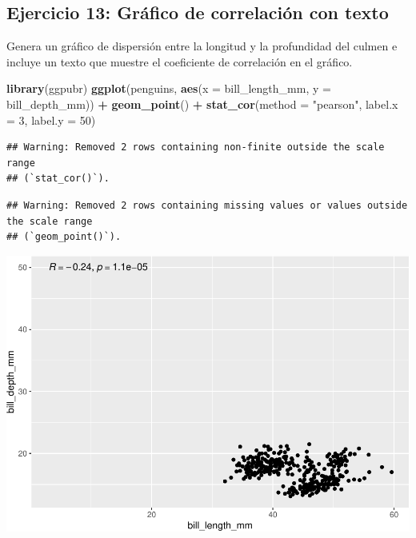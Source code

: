 \documentclass[
]{book}
\newenvironment{Shaded}{\begin{snugshade}}{\end{snugshade}}
\newcommand{\AttributeTok}[1]{\textcolor[rgb]{0.13,0.29,0.53}{#1}}
\newcommand{\DecValTok}[1]{\textcolor[rgb]{0.00,0.00,0.81}{#1}}
\newcommand{\FunctionTok}[1]{\textcolor[rgb]{0.13,0.29,0.53}{\textbf{#1}}}
\newcommand{\NormalTok}[1]{#1}
\newcommand{\SpecialCharTok}[1]{\textcolor[rgb]{0.81,0.36,0.00}{\textbf{#1}}}
\newcommand{\StringTok}[1]{\textcolor[rgb]{0.31,0.60,0.02}{#1}}
\begin{document}
\hypertarget{ejercicio-13-gruxe1fico-de-correlaciuxf3n-con-texto}{%
\subsection{Ejercicio 13: Gráfico de correlación con texto}\label{ejercicio-13-gruxe1fico-de-correlaciuxf3n-con-texto}}

Genera un gráfico de dispersión entre la longitud y la profundidad del culmen e incluye un texto que muestre el coeficiente de correlación en el gráfico.

\begin{Shaded}
\begin{Highlighting}[]
\FunctionTok{library}\NormalTok{(ggpubr)}
\FunctionTok{ggplot}\NormalTok{(penguins, }\FunctionTok{aes}\NormalTok{(}\AttributeTok{x =}\NormalTok{ bill\_length\_mm, }\AttributeTok{y =}\NormalTok{ bill\_depth\_mm)) }\SpecialCharTok{+}
  \FunctionTok{geom\_point}\NormalTok{() }\SpecialCharTok{+}
  \FunctionTok{stat\_cor}\NormalTok{(}\AttributeTok{method =} \StringTok{"pearson"}\NormalTok{, }\AttributeTok{label.x =} \DecValTok{3}\NormalTok{, }\AttributeTok{label.y =} \DecValTok{50}\NormalTok{)}
\end{Highlighting}
\end{Shaded}

\begin{verbatim}
## Warning: Removed 2 rows containing non-finite outside the scale range
## (`stat_cor()`).
\end{verbatim}

\begin{verbatim}
## Warning: Removed 2 rows containing missing values or values outside the scale range
## (`geom_point()`).
\end{verbatim}

\includegraphics{bookdown-demo_files/figure-latex/unnamed-chunk-189-1.pdf}
\end{document}
